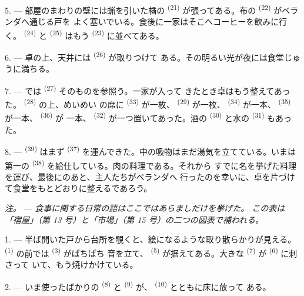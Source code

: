\VUsaut{4.6mm}
\VUsaut{3.0mm}

5. --- 部屋のまわりの壁には蝋を引いた楢の \textsuperscript{(21)}
が張ってある。布の \textsuperscript{(22)} がベランダへ通じる戸を
よく塞いでいる。食後に一家はそこへコーヒーを飲みに行く。
\textsuperscript{(24)} と \textsuperscript{(25)} はもう
\textsuperscript{(23)} に並べてある。

6. --- 卓の上、天井には \textsuperscript{(26)} が取りつけて
ある。その明るい光が夜には食堂じゅうに満ちる。

7. --- では \textsuperscript{(27)} そのものを参照う。一家が入って
きたとき卓はもう整えてあった。 \textsuperscript{(28)} の上、めいめい
の席に \textsuperscript{(33)} が一枚、
\textsuperscript{(29)} が一枚、 \textsuperscript{(34)} が一本、
 \textsuperscript{(35)} が一本、 \textsuperscript{(36)} が
一本、 \textsuperscript{(32)} が一つ置いてあった。酒の
\textsuperscript{(30)} と水の \textsuperscript{(31)} もあった。

8. ---  \textsuperscript{(39)} はまず
\textsuperscript{(37)} を運んできた。中の吸物はまだ湯気を立てている。いまは第一の
 \textsuperscript{(38)} を給仕している。肉の料理である。それから
すでに名を挙げた料理を運び、最後にのあと、主人たちがベランダへ
行ったのを幸いに、卓を片づけて食堂をもとどおりに整えるであろう。

\textit{注。} --- \textit{食事に関する日常の語はここではあらましだけを挙げた。
この表は「宿屋」（第 13 号）と「市場」（第 15 号）の二つの図表で補われる。}

\VUsaut{4.6mm}
\VUsaut{3.0mm}

1. --- 半ば開いた戸から台所を覗くと、絵になるような取り散らかりが見える。
 \textsuperscript{(1)} の前では \textsuperscript{(3)} がぱちぱち
音を立て、 \textsuperscript{(5)} が据えてある。大きな
 \textsuperscript{(7)} が \textsuperscript{(6)} に刺さって
いて、もう焼けかけている。

2. --- いま使ったばかりの \textsuperscript{(8)} と
\textsuperscript{(9)} が、 \textsuperscript{(10)} とともに床に放って
ある。

